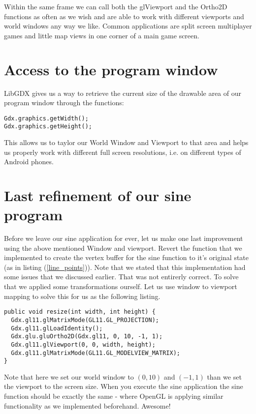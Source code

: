 \documentclass[11pt,a4paper]{article}
\begin{document}
Within the same frame we can call both the glViewport and the Ortho2D functions
as often as we wish and are able to work with different viewports and world
windows any way we like. Common applications are split screen multiplayer games
and little map views in one corner of a main game screen.

\section{Access to the program window}
LibGDX gives us a way to retrieve the current size of the drawable area of our
program window through the functions:
\begin{lstlisting}
Gdx.graphics.getWidth();
Gdx.graphics.getHeight();
\end{lstlisting}
This allows us to taylor our World Window and Viewport to that area and helps
us properly work with different full screen resolutions, i.e. on different
types of Android phones.

\section{Last refinement of our sine program}
Before we leave our sine application for ever, let us make one last improvement
using the above mentioned Window and viewport. Revert the function that
we implemented to create the vertex buffer for the sine function to it's
original state (as in listing (\ref{line_points})). Note that we stated that this
implementation had some issues that we discussed earlier. That was not entirerly
correct. To solve that we applied some transformations ourself. Let us use
window to viewport mapping to solve this for us as the following listing.
\begin{lstlisting}
public void resize(int width, int height) {
  Gdx.gl11.glMatrixMode(GL11.GL_PROJECTION);
  Gdx.gl11.glLoadIdentity();
  Gdx.glu.gluOrtho2D(Gdx.gl11, 0, 10, -1, 1);
  Gdx.gl11.glViewport(0, 0, width, height);
  Gdx.gl11.glMatrixMode(GL11.GL_MODELVIEW_MATRIX);    
}
\end{lstlisting}
Note that here we set our world window to $(0,10)$ and $(-1,1)$ than we set the viewport to the
screen size. When you execute the sine application the sine function should be exactly the same -
where OpenGL is applying similar functionality as we implemented beforehand. Awesome!


\end{document}
